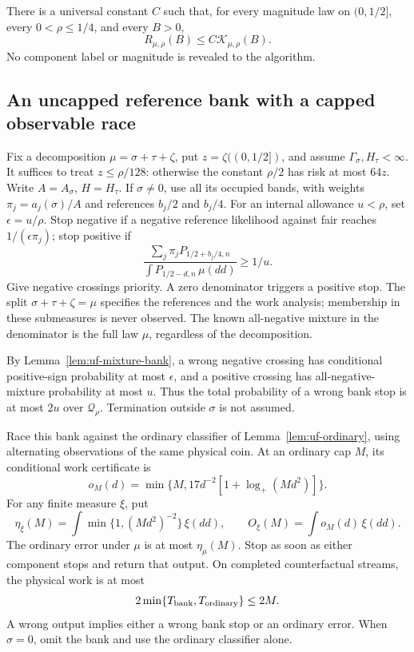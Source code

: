 \begin{theorem}\label{thm:three-piece-upper}
There is a universal constant $C$ such that, for every magnitude law on
$(0,1/2]$, every $0<\rho\le1/4$, and every $B>0$,
\begin{equation}\label{eq:three-piece-upper}
 R_{\mu,\rho}(B)\le C\mathcal K_{\mu,\rho}(B).
\end{equation}
No component label or magnitude is revealed to the algorithm.
\end{theorem}

\subsection{An uncapped reference bank with a capped observable race}

Fix a decomposition $\mu=\sigma+\tau+\zeta$, put
$z=\zeta((0,1/2])$, and assume $\Gamma_\sigma,H_\tau<\infty$.
It suffices to treat $z\le\rho/128$: otherwise the constant $\rho/2$
has risk at most $64z$. Write $A=A_\sigma$, $H=H_\tau$.
If $\sigma\ne0$, use all its occupied bands, with weights
$\pi_j=a_j(\sigma)/A$ and references $b_j/2$ and $b_j/4$.
For an internal allowance $u<\rho$, set $\epsilon=u/\rho$.
Stop negative if a negative reference likelihood against fair reaches
$1/(\epsilon\pi_j)$; stop positive if
\begin{equation}\label{eq:split-bank-ratio}
 \frac{\sum_j\pi_jP_{1/2+b_j/4,n}}
      {\int P_{1/2-d,n}\,\mu(dd)}\ge1/u.
\end{equation}
Give negative crossings priority. A zero denominator triggers a positive
stop. The split $\sigma+\tau+\zeta=\mu$ specifies the references and the
work analysis; membership in these submeasures is never observed.
The known all-negative mixture in the denominator is the full law
$\mu$, regardless of the decomposition.

By Lemma~\ref{lem:uf-mixture-bank}, a wrong negative crossing has
conditional positive-sign probability at most $\epsilon$, and a positive
crossing has all-negative-mixture probability at most $u$. Thus the total
probability of a wrong bank stop is at most $2u$ over $\mathcal Q_\rho$.
Termination outside $\sigma$ is not assumed.

Race this bank against the ordinary classifier of Lemma~\ref{lem:uf-ordinary}, using
alternating observations of the same physical coin. At an ordinary cap
$M$, its conditional work certificate is
\[
 o_M(d)=\min\{M,17d^{-2}[1+\log_+(Md^2)]\}.
\]
For any finite measure $\xi$, put
\[
 \eta_\xi(M)=\int\min\{1,(Md^2)^{-2}\}\,\xi(dd),\qquad
 O_\xi(M)=\int o_M(d)\,\xi(dd).
\]
The ordinary error under $\mu$ is at most $\eta_\mu(M)$.
Stop as soon as either component stops and return that output.
On completed counterfactual streams, the physical work is at most
\[
 2\min\{T_{\rm bank},T_{\rm ordinary}\}\le2M.
\]
A wrong output implies either a wrong bank stop or an ordinary error.
When $\sigma=0$, omit the bank and use the ordinary classifier alone.

